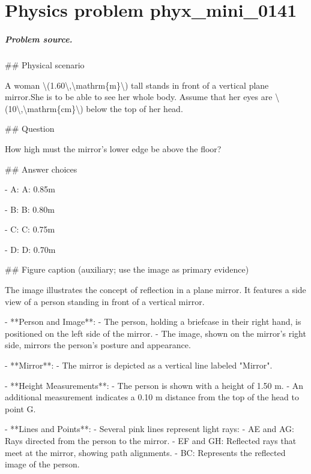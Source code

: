 
\chapter{Physics problem phyx\_mini\_0141}
\label{ch:PhyXMiniProblems_problem_phyx_mini_0141}

\paragraph{Problem source.}
\#\# Physical scenario

A woman \textbackslash{}(1.60\textbackslash{},\textbackslash{}mathrm\{m\}\textbackslash{}) tall stands in front of a vertical plane mirror.She is to be able to see her whole body. Assume that her eyes are \textbackslash{}(10\textbackslash{},\textbackslash{}mathrm\{cm\}\textbackslash{}) below the top of her head.

\#\# Question

How high must the mirror's lower edge be above the floor?

\#\# Answer choices

- A: A: 0.85m

- B: B: 0.80m

- C: C: 0.75m

- D: D: 0.70m

\#\# Figure caption (auxiliary; use the image as primary evidence)

The image illustrates the concept of reflection in a plane mirror. It features a side view of a person standing in front of a vertical mirror. 

- **Person and Image**: 
  - The person, holding a briefcase in their right hand, is positioned on the left side of the mirror.
  - The image, shown on the mirror’s right side, mirrors the person's posture and appearance.

- **Mirror**:
  - The mirror is depicted as a vertical line labeled "Mirror". 

- **Height Measurements**:
  - The person is shown with a height of 1.50 m. 
  - An additional measurement indicates a 0.10 m distance from the top of the head to point G.

- **Lines and Points**:
  - Several pink lines represent light rays:
    - AE and AG: Rays directed from the person to the mirror.
    - EF and GH: Reflected rays that meet at the mirror, showing path alignments.
    - BC: Represents the reflected image of the person.

